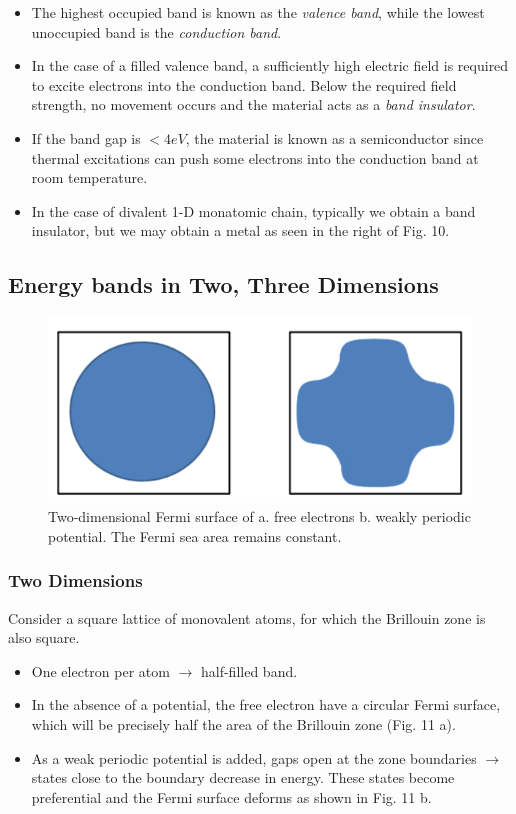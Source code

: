 \documentclass[10pt]{article}
\begin{document}
\begin{itemize}
\begin{figure}
{       higher energy band were to be lifted, an indirect band gap would be obtained.}
  \end{figure}
  \item The highest occupied band is known as the \emph{valence band}, while the lowest unoccupied band is the \emph{conduction band}.
  \item In the case of a filled valence band, a sufficiently high electric field is required to excite electrons into the conduction band.
  Below the required field strength, no movement occurs and the material acts as a \emph{band insulator}.
  \item If the band gap is $< 4eV$, the material is known as a semiconductor since thermal excitations can push some electrons into the
  conduction band at room temperature.
  \item In the case of divalent 1-D monatomic chain, typically we obtain a band insulator, but we may obtain a metal as seen in the right of Fig. 10.
\end{itemize}

\subsection{Energy bands in Two, Three Dimensions}
\begin{figure}
  \centering
    \includegraphics[width=\textwidth]{tb11}
    \caption{Two-dimensional Fermi surface of a. free electrons b. weakly periodic potential. The Fermi sea area remains constant.}
\end{figure}

\subsubsection{Two Dimensions}
Consider a square lattice of monovalent atoms, for which the Brillouin zone is also square.
\begin{itemize}
  \item One electron per atom $\rightarrow$ half-filled band.
  \item In the absence of a potential, the free electron have a circular Fermi surface, which will be precisely half
  the area of the Brillouin zone (Fig. 11 a).
  \item As a weak periodic potential is added, gaps open at the zone boundaries $\rightarrow$ states close to the
  boundary decrease in energy. These states become preferential and the Fermi surface deforms as shown in Fig. 11 b.
\end{itemize}
\end{document}
